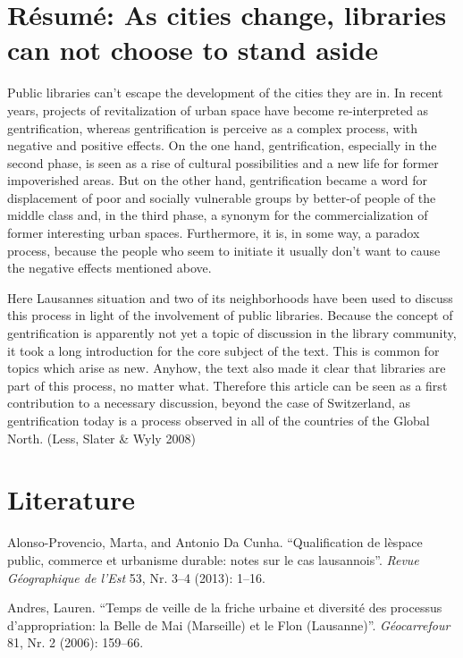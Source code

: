 \documentclass[a4paper,
fontsize=11pt,
oneside,
numbers=noperiodatend,
parskip=half-,
bibliography=totoc,
final
]{scrartcl}
\begin{document}
\section{Résumé: As cities change, libraries can not choose to
stand
aside}\label{ruxe9sumuxe9-as-cities-change-libraries-can-not-choose-to-stand-aside}

Public libraries can't escape the development of the cities they are in.
In recent years, projects of revitalization of urban space have become
re-interpreted as gentrification, whereas gentrification is perceive as
a complex process, with negative and positive effects. On the one hand,
gentrification, especially in the second phase, is seen as a rise of
cultural possibilities and a new life for former impoverished areas. But
on the other hand, gentrification became a word for displacement of poor
and socially vulnerable groups by better-of people of the middle class
and, in the third phase, a synonym for the commercialization of former
interesting urban spaces. Furthermore, it is, in some way, a paradox
process, because the people who seem to initiate it usually don't want
to cause the negative effects mentioned above.

Here Lausannes situation and two of its neighborhoods have been used to
discuss this process in light of the involvement of public libraries.
Because the concept of gentrification is apparently not yet a topic of
discussion in the library community, it took a long introduction for the
core subject of the text. This is common for topics which arise as new.
Anyhow, the text also made it clear that libraries are part of this
process, no matter what. Therefore this article can be seen as a first
contribution to a necessary discussion, beyond the case of Switzerland,
as gentrification today is a process observed in all of the countries of
the Global North. (Less, Slater \& Wyly 2008)

\section{Literature}\label{literature}

Alonso-Provencio, Marta, and Antonio Da Cunha. \enquote{Qualification de
lèspace public, commerce et urbanisme durable: notes sur le cas
lausannois}. \emph{Revue Géographique de l'Est} 53, Nr. 3--4 (2013):
1--16.

Andres, Lauren. \enquote{Temps de veille de la friche urbaine et
diversité des processus d'appropriation: la Belle de Mai (Marseille) et
le Flon (Lausanne)}. \emph{Géocarrefour} 81, Nr. 2 (2006): 159--66.
\end{document}
